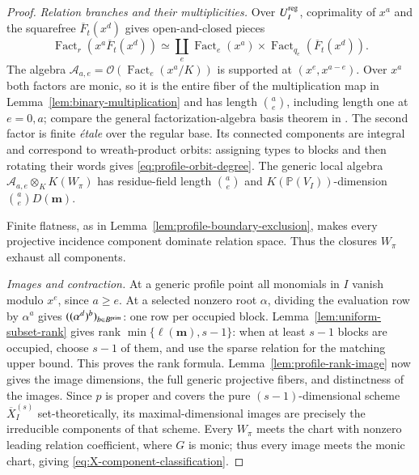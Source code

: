 \documentclass[10pt,fleqn]{article}
\numberwithin{equation}{section}
\newcommand{\PP}{\mathbb P}
\newcommand{\Fact}{\operatorname{Fact}}
\begin{document}
\begin{proof}
\emph{Relation branches and their multiplicities.}
Over $U_I^{\rm reg}$, coprimality of $x^a$ and the squarefree
$\overline F_t(x^d)$ gives open-and-closed pieces
\begin{equation}\label{eq:factorization-e-splitting}
 \Fact_r(x^a\overline F_t(x^d))
 \simeq\coprod_e\Fact_e(x^a)\times\Fact_{q_e}(\overline F_t(x^d)).
\end{equation}
The algebra $\mathcal A_{a,e}=\mathcal O(\Fact_e(x^a/K))$ is supported
at $(x^e,x^{a-e})$.  Over $x^a$ both factors are monic, so it is the
entire fiber of the multiplication map in Lemma~\ref{lem:binary-multiplication}
and has length $\binom ae$,
including length one at $e=0,a$; compare the general
factorization-algebra basis theorem in \cite{LaksovThorup}.  The second factor is finite
\emph{\'etale} over the regular base.  Its connected components are
integral and correspond to wreath-product orbits: assigning types to blocks and then
rotating their words gives \eqref{eq:profile-orbit-degree}.
The generic local algebra
$\mathcal A_{a,e}\otimes_K K(W_\pi)$ has residue-field length
$\binom ae$ and $K(\PP(V_I))$-dimension $\binom ae D(\boldsymbol m)$.

Finite flatness, as in Lemma~\ref{lem:profile-boundary-exclusion},
makes every projective incidence component dominate relation space.
Thus the closures $W_\pi$ exhaust all components.

\emph{Images and contraction.}
At a generic profile point all monomials in $I$ vanish modulo $x^e$,
since $a\ge e$.  At a selected nonzero root $\alpha$, dividing the
evaluation row by $\alpha^a$ gives
$((\alpha^d)^b)_{b\in B^{\rm prim}}$: one row per occupied block.
Lemma~\ref{lem:uniform-subset-rank} gives rank
$\min\{\ell(\boldsymbol m),s-1\}$: when at least $s-1$ blocks are occupied,
choose $s-1$ of them, and use the sparse relation for the matching upper bound.
This proves the rank formula.  Lemma~\ref{lem:profile-rank-image} now gives
the image dimensions, the full generic projective fibers, and distinctness
of the images.  Since $p$ is proper and covers the pure $(s-1)$-dimensional
scheme $\overline X_I^{(s)}$ set-theoretically, its maximal-dimensional images
are precisely the irreducible components of that scheme.  Every $W_\pi$ meets
the chart with nonzero leading relation coefficient, where $G$ is monic;
thus every image meets the monic chart, giving \eqref{eq:X-component-classification}.


\end{proof}
\end{document}
